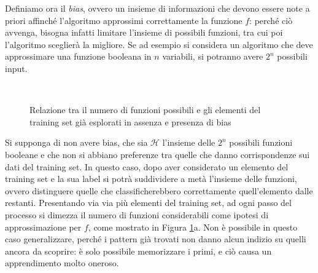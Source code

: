 \documentclass{article}
\begin{document}
	Definiamo ora il \textit{bias}, ovvero un insieme di informazioni che devono essere note a priori affinché l'algoritmo approssimi correttamente la funzione $f$: perché ciò avvenga, bisogna infatti limitare l'insieme di possibili funzioni, tra cui poi l'algoritmo sceglierà la migliore.
	Se ad esempio si considera un algoritmo che deve approssimare una funzione booleana in $n$ variabili, si potranno avere $2^n$ possibili input. 
	\begin{figure}[h]
		\centering
		 \quad
		 \\
		\caption{Relazione tra il numero di funzioni possibili e gli elementi del training set già esplorati in assenza e presenza di bias}
		\label{fig:bias}
		
	\end{figure}
	Si supponga di non avere bias, che sia $\mathcal{H}$ l'insieme delle $2^n$ possibili funzioni booleane e che non si abbiano preferenze tra quelle che danno corrispondenze sui dati del training set. In questo caso, dopo aver considerato un elemento del training set e la sua label si potrà suddividere a metà l'insieme delle funzioni, ovvero distinguere quelle che classificherebbero correttamente quell'elemento dalle restanti. Presentando via via più elementi del training set, ad ogni passo del processo si dimezza il numero di funzioni considerabili come ipotesi di approssimazione per $f$, come mostrato in Figura \ref{fig:bias}a. Non è possibile in questo caso generalizzare, perché i pattern già trovati non danno alcun indizio su quelli ancora da scoprire: è solo possibile memorizzare i primi, e ciò causa un apprendimento molto oneroso.\\
\end{document}

